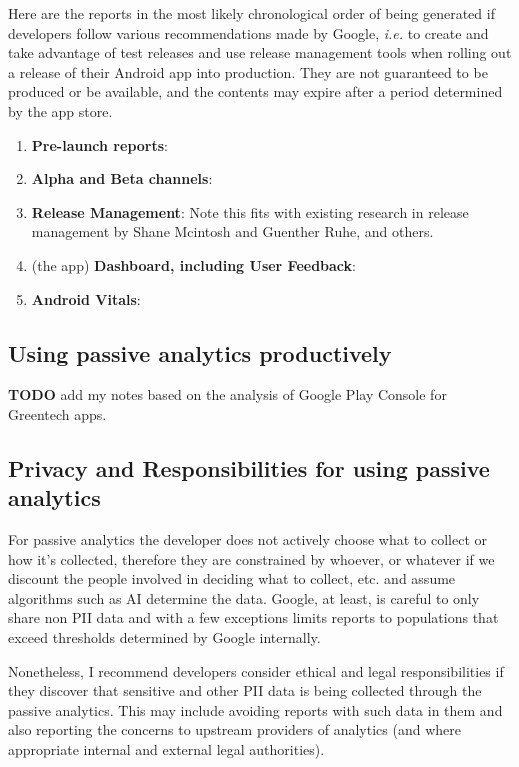 Here are the reports in the most likely chronological order of being generated if developers follow various recommendations made by Google, \emph{i.e.} to create and take advantage of test releases and use release management tools when rolling out a release of their Android app into production. They are not guaranteed to be produced or be available, and the contents may expire after a period determined by the app store.

\begin{enumerate}
    \item \textbf{Pre-launch reports}: 
    \item \textbf{Alpha and Beta channels}:
    \item \textbf{Release Management}: Note this fits with existing research in release management by Shane Mcintosh and Guenther Ruhe, and others.
    
    \item (the app) \textbf{Dashboard, including User Feedback}:
    \item \textbf{Android Vitals}:
\end{enumerate}

\subsection{Using passive analytics productively}

\textbf{TODO} add my notes based on the analysis of Google Play Console for Greentech apps.


\subsection{Privacy and Responsibilities for using passive analytics}
For passive analytics the developer does not actively choose what to collect or how it's collected, therefore they are constrained by whoever, or whatever if we discount the people involved in deciding what to collect, etc. and assume algorithms such as AI determine the data. Google, at least, is careful to only share non PII %
data and with a few exceptions limits reports to populations that exceed thresholds determined by Google internally. %

Nonetheless, I recommend developers consider ethical and legal responsibilities if they discover that sensitive and other PII data is being collected through the passive analytics. This may include avoiding reports with such data in them and also reporting the concerns to upstream providers of analytics (and where appropriate internal and external legal authorities).

